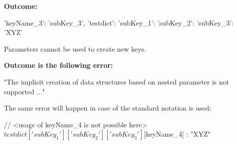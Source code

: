 \vspace{2ex}

\textbf{Outcome:}

\begin{pythonlog}
{'keyName_3': 'subKey_3',
 'testdict': {'subKey_1': {'subKey_2': {'subKey_3': 'XYZ'}}}}
\end{pythonlog}

\vspace{2ex}

Parameters cannot be used to create new keys.


\vspace{2ex}

\textbf{Outcome is the following error:}

\begin{pythonlog}
"The implicit creation of data structures based on nested parameter is not supported ..."
\end{pythonlog}

The same error will happen in case of the standard notation is used:

\begin{pythoncode}
{
   // <usage of keyName\_4 is not possible here>
   ${testdict}['subKey_1']['subKey_2']['subKey_3'][${keyName_4}] : "XYZ"
}
\end{pythoncode}










